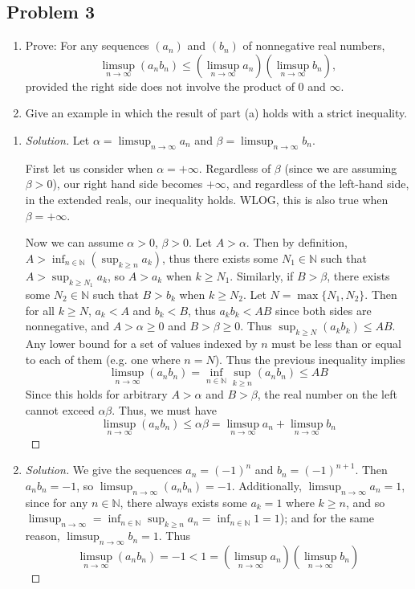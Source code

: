 \documentclass{article}
\newcommand{\N}{{\mathbb N}}
\begin{document}
\subsection*{Problem 3}
{\it \begin{enumerate}
	\item Prove: For any sequences $(a_n)$ and $(b_n)$ of nonnegative real numbers,
		\[
			\limsup_{n\to\infty}(a_nb_n) \leq \left(\limsup_{n\to\infty}a_n\right)
			\left(\limsup_{n\to\infty} b_n\right),
		\]
		provided the right side does not involve the product of $0$ and $\infty$.
	\item Give an example in which the result of part (a) holds with a strict inequality.
\end{enumerate}}

\begin{enumerate}
	\item \begin{proof}[Solution]\let\qed\relax
		Let $\alpha = \limsup_{n\to\infty} a_n$ and $\beta = \limsup_{n\to\infty}b_n$.

		First let us consider when $\alpha = +\infty$.
		Regardless of $\beta$ (since we are assuming $\beta > 0$),
		our right hand side becomes $+\infty$,
		and regardless of the left-hand side,
		in the extended reals, our inequality holds.
		WLOG, this is also true when $\beta = +\infty$.

		Now we can assume $\alpha > 0$, $\beta > 0$.
		Let $A > \alpha$.
		Then by definition, $A > \inf_{n \in \N}\left(\sup_{k\geq n} a_k\right)$,
		thus there exists some $N_1 \in \N$ such that $A > \sup_{k \geq N_1} a_k$,
		so $A > a_k$ when $k \geq N_1$.
		Similarly, if $B > \beta$,
		there exists some $N_2 \in \N$ such that $B > b_k$ when $k \geq N_2$.
		Let $N = \max\{N_1,N_2\}$.
		Then for all $k \geq N$,
		$a_k < A$ and $b_k < B$,
		thus $a_kb_k < AB$
		since both sides are nonnegative, and $A>\alpha\geq0$ and $B>\beta\geq0$.
		Thus $\sup_{k \geq N} (a_kb_k) \leq AB$.
		Any lower bound for a set of values indexed by $n$
		must be less than or equal to each of them
		(e.g. one where $n = N$).
		Thus the previous inequality implies
		\[
			\limsup_{n\to\infty}(a_nb_n) = \inf_{n\in\N}\sup_{k\geq n}(a_nb_n)
			\leq AB
		\]
		Since this holds for arbitrary $A > \alpha$ and $B > \beta$,
		the real number on the left cannot exceed $\alpha \beta$.
		Thus, we must have
		\[
			\limsup_{n\to\infty}(a_nb_n) \leq \alpha\beta = \limsup_{n\to\infty} a_n + \limsup_{n\to\infty} b_n
		\]
	\end{proof}
	\item \begin{proof}[Solution]\let\qed\relax
		We give the sequences $a_n = (-1)^n$ and $b_n = (-1)^{n+1}$.
		Then $a_nb_n = -1$,
		so $\limsup_{n\to\infty}(a_nb_n) = -1$.
		Additionally, $\limsup_{n\to\infty} a_n = 1$,
		since for any $n \in \N$,
		there always exists some $a_k = 1$ where $k \geq n$,
		and so $\limsup_{n\to\infty} = \inf_{n\in\N} \sup_{k \geq n} a_n
		= \inf_{n\in\N} 1 = 1$);
		and for the same reason, $\limsup_{n\to\infty} b_n = 1$.
		Thus
		\[
			\limsup_{n\to\infty} (a_nb_n) = -1 < 1 =
			\left(\limsup_{n\to\infty} a_n\right)\left(\limsup_{n\to\infty}b_n\right)
		\]
	\end{proof}
\end{enumerate}
\end{document}
